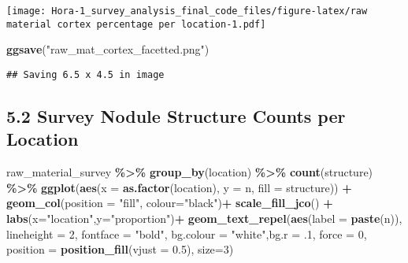 \documentclass[
]{article}
\newenvironment{Shaded}{\begin{snugshade}}{\end{snugshade}}
\newcommand{\AttributeTok}[1]{\textcolor[rgb]{0.13,0.29,0.53}{#1}}
\newcommand{\DecValTok}[1]{\textcolor[rgb]{0.00,0.00,0.81}{#1}}
\newcommand{\FloatTok}[1]{\textcolor[rgb]{0.00,0.00,0.81}{#1}}
\newcommand{\FunctionTok}[1]{\textcolor[rgb]{0.13,0.29,0.53}{\textbf{#1}}}
\newcommand{\NormalTok}[1]{#1}
\newcommand{\SpecialCharTok}[1]{\textcolor[rgb]{0.81,0.36,0.00}{\textbf{#1}}}
\newcommand{\StringTok}[1]{\textcolor[rgb]{0.31,0.60,0.02}{#1}}
\begin{document}
\texttt{[image: Hora-1\_survey\_analysis\_final\_code\_files/figure-latex/raw material cortex percentage per location-1.pdf]}

\begin{Shaded}
\begin{Highlighting}[]
\FunctionTok{ggsave}\NormalTok{(}\StringTok{"raw\_mat\_cortex\_facetted.png"}\NormalTok{)}
\end{Highlighting}
\end{Shaded}

\begin{verbatim}
## Saving 6.5 x 4.5 in image
\end{verbatim}

\hypertarget{survey-nodule-structure-counts-per-location}{%
\subsection{5.2 Survey Nodule Structure Counts per
Location}\label{survey-nodule-structure-counts-per-location}}

\begin{Shaded}
\begin{Highlighting}[]
\NormalTok{raw\_material\_survey }\SpecialCharTok{\%\textgreater{}\%}
  \FunctionTok{group\_by}\NormalTok{(location) }\SpecialCharTok{\%\textgreater{}\%}
  \FunctionTok{count}\NormalTok{(structure) }\SpecialCharTok{\%\textgreater{}\%}
  \FunctionTok{ggplot}\NormalTok{(}\FunctionTok{aes}\NormalTok{(}\AttributeTok{x =} \FunctionTok{as.factor}\NormalTok{(location), }\AttributeTok{y =}\NormalTok{ n, }\AttributeTok{fill =}\NormalTok{ structure)) }\SpecialCharTok{+}
  \FunctionTok{geom\_col}\NormalTok{(}\AttributeTok{position =} \StringTok{"fill"}\NormalTok{, }\AttributeTok{colour=}\StringTok{"black"}\NormalTok{)}\SpecialCharTok{+}
  \FunctionTok{scale\_fill\_jco}\NormalTok{() }\SpecialCharTok{+}
  \FunctionTok{labs}\NormalTok{(}\AttributeTok{x=}\StringTok{"location"}\NormalTok{,}\AttributeTok{y=}\StringTok{"proportion"}\NormalTok{)}\SpecialCharTok{+}
  \FunctionTok{geom\_text\_repel}\NormalTok{(}\FunctionTok{aes}\NormalTok{(}\AttributeTok{label =} \FunctionTok{paste}\NormalTok{(n)), }
                \AttributeTok{lineheight =} \DecValTok{2}\NormalTok{,}
            \AttributeTok{fontface =} \StringTok{"bold"}\NormalTok{, }\AttributeTok{bg.colour =} \StringTok{"white"}\NormalTok{,}\AttributeTok{bg.r =}\NormalTok{ .}\DecValTok{1}\NormalTok{, }\AttributeTok{force =} \DecValTok{0}\NormalTok{,}
                \AttributeTok{position =} \FunctionTok{position\_fill}\NormalTok{(}\AttributeTok{vjust =} \FloatTok{0.5}\NormalTok{), }\AttributeTok{size=}\DecValTok{3}\NormalTok{)}
\end{Highlighting}
\end{Shaded}
\end{document}

